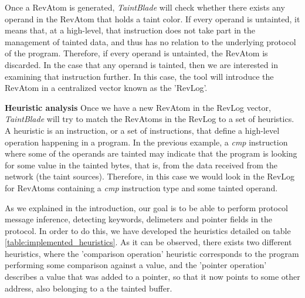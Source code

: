 \documentclass[conference]{IEEEtran}
\begin{document}
Once a RevAtom is generated, \textit{TaintBlade} will check whether there
exists any operand in the RevAtom that holds a taint color. If every operand is
untainted, it means that, at a high-level, that instruction does not take part
in the management of tainted data, and thus has no relation to the underlying
protocol of the program. Therefore, if every operand is untainted, the RevAtom
is discarded. In the case that any operand is tainted, then we are interested
in examining that instruction further. In this case, the tool will introduce
the RevAtom in a centralized vector known as the 'RevLog'.

\textbf{Heuristic analysis}
Once we have a new RevAtom in the RevLog vector, \textit{TaintBlade} will try to match the RevAtoms in the RevLog
to a set of heuristics. A heuristic is an instruction, or a set of instructions, that define a high-level
operation happening in a program. In the previous example, a \textit{cmp} instruction where some of the operands
are tainted may indicate that the program is looking for some value in the tainted bytes, that is, from the data
received from the network (the taint sources). Therefore, in this case we would look in the RevLog for RevAtoms
containing a \textit{cmp} instruction type and some tainted operand.

As we explained in the introduction, our goal is to be able to perform protocol
message inference, detecting keywords, delimeters and pointer fields in the
protocol. In order to do this, we have developed the heuristics detailed on
table \ref{table:implemented_heuristics}. As it can be observed, there exists
two different heuristics, where the 'comparison operation' heuristic
corresponds to the program performing some comparison against a value, and the
'pointer operation' describes a value that was added to a pointer, so that it
now points to some other address, also belonging to a the tainted buffer.
\end{document}
